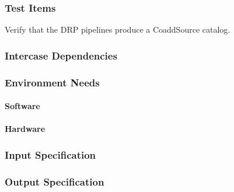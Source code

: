 \subsubsection{Test Items}
Verify that the DRP pipelines produce a CoaddSource catalog.



\subsubsection{Intercase Dependencies}

\subsubsection{Environment Needs}

\paragraph{Software}

\paragraph{Hardware}

\subsubsection{Input Specification}

\subsubsection{Output Specification}

